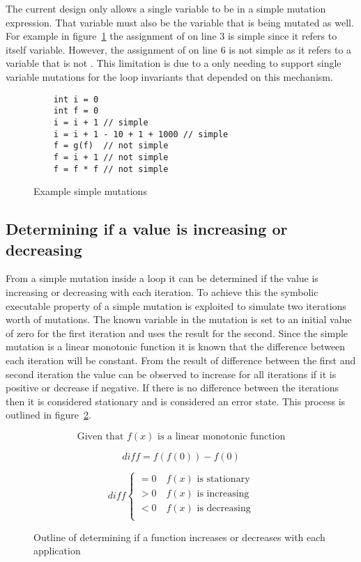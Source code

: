 The current design only allows a single variable to be in a simple mutation
expression.
That variable must also be the variable that is being mutated as well.
For example in figure~\ref{lst:simple-mutations} the assignment of  on
line 3 is simple since it refers to itself variable.
However, the assignment of  on line 6 is not simple as
it refers to a variable that is not .
This limitation is due to a only needing to 
support single variable mutations for the loop invariants
that depended on this mechanism.

\begin{figure}[ht]
	\begin{lstlisting}
	int i = 0
	int f = 0
	i = i + 1 // simple
	i = i + 1 - 10 + 1 + 1000 // simple
	f = g(f)  // not simple
	f = i + 1 // not simple
	f = f * f // not simple
	\end{lstlisting}
	\caption{Example simple mutations}
	\label{lst:simple-mutations}
\end{figure}

\subsection{Determining if a value is increasing or decreasing}\label{s:sequence-dir}


From a simple mutation inside a loop it can be determined if the value is
increasing or decreasing with each iteration.
To achieve this the symbolic executable property of a simple mutation is
exploited to simulate two iterations worth of mutations.
The known variable in the mutation is set to an initial value of zero for
the first iteration and uses the result for the second.
Since the simple mutation is a linear monotonic function it is known that
the difference between each iteration will be constant.
From the result of difference between the first and second iteration the
value can be observed to increase for all iterations if it is positive or
decrease if negative. If there is no difference between the iterations then
it is considered stationary and is considered an error state.
This process is outlined in figure~\ref{math:simple-mutation}.

\begin{figure}
	$$\text{Given that } f(x) \text{ is a linear monotonic function}$$
	
	$$diff = f(f(0)) - f(0)$$
	
	\[
	diff \begin{cases}
	= 0 \quad f(x) \text{ is stationary}\\
	> 0 \quad f(x) \text{ is increasing}\\
	< 0 \quad f(x) \text{ is decreasing}\\
	\end{cases}
	\]
	\caption{Outline of determining if a function increases or decreases with
		each application}
	\label{math:simple-mutation}
\end{figure}

